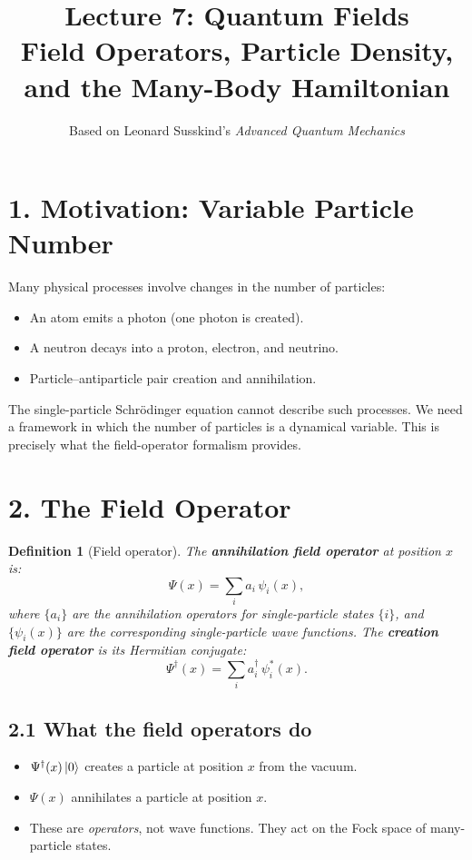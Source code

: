 \documentclass[12pt,a4paper]{article}
\title{\textbf{Lecture 7: Quantum Fields} \\ \large Field Operators, Particle Density, and the Many-Body Hamiltonian}
\author{Based on Leonard Susskind's \textit{Advanced Quantum Mechanics}}
\date{}
\newtheorem{definition}{Definition}
\begin{document}
\maketitle
\thispagestyle{fancy}

\section{1. Motivation: Variable Particle Number}

Many physical processes involve changes in the number of particles:
\begin{itemize}[nosep]
    \item An atom emits a photon (one photon is created).
    \item A neutron decays into a proton, electron, and neutrino.
    \item Particle--antiparticle pair creation and annihilation.
\end{itemize}
The single-particle Schr\"odinger equation cannot describe such processes.  We need a framework in which the number of particles is a dynamical variable.  This is precisely what the field-operator formalism provides.

\section{2. The Field Operator}

\begin{definition}[Field operator]
The \textbf{annihilation field operator} at position $x$ is:
\[
    \Psi(x) = \sum_i a_i\,\psi_i(x),
\]
where $\{a_i\}$ are the annihilation operators for single-particle states $\{i\}$, and $\{\psi_i(x)\}$ are the corresponding single-particle wave functions.  The \textbf{creation field operator} is its Hermitian conjugate:
\[
    \Psi^\dagger(x) = \sum_i a_i^\dagger\,\psi_i^*(x).
\]
\end{definition}

\subsection{2.1 What the field operators do}

\begin{itemize}[nosep]
    \item $\Psi^\dagger(x)\ket{0}$ creates a particle at position $x$ from the vacuum.
    \item $\Psi(x)$ annihilates a particle at position $x$.
    \item These are \emph{operators}, not wave functions.  They act on the Fock space of many-particle states.
\end{itemize}
\end{document}
